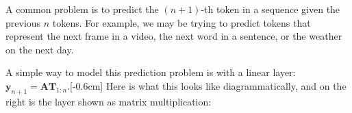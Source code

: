 A common problem is to predict the $(n+1)$-th token in a sequence given the previous $n$ tokens. For example, we may be trying to predict tokens that represent the next frame in a video, the next word in a sentence, or the weather on the next day.

A simple way to model this prediction problem is with a linear layer: $\mathbf{y}_{n+1} = \mathbf{A}\mathbf{T}_{1:n}$.[-0.6cm] 
Here is what this looks like diagrammatically, and on the right is the layer shown as matrix multiplication:
